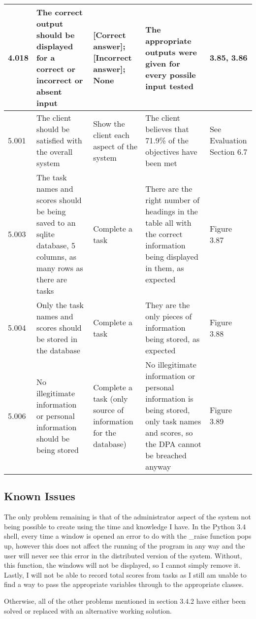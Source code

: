 \begin{landscape}
\begin{center}
\begin{longtable}{|p{2.5cm}|p{4cm}|p{4cm}|p{4.5cm}|p{3cm}|}
4.018 & The correct output should be displayed for a correct or incorrect or absent input & [Correct answer]; [Incorrect answer]; None & The appropriate outputs were given for every possile input tested & 3.85, 3.86 \\ \hline
5.001 & The client should be satisfied with the overall system & Show the client each aspect of the system & The client believes that 71.9\% of the objectives have been met & See Evaluation Section 6.7 \\ \hline
5.003 & The task names and scores should be being saved to an sqlite database, 5 columns, as many rows as there are tasks & Complete a task & There are the right number of headings in the table all with the correct information being displayed in them, as expected & Figure 3.87 \\ \hline
5.004 & Only the task names and scores should be stored in the database & Complete a task & They are the only pieces of information being stored, as expected & Figure 3.88 \\ \hline
5.006 & No illegitimate information or personal information should be being stored & Complete a task (only source of information for the database) & No illegitimate information or personal information is being stored, only task names and scores, so the DPA cannot be breached anyway & Figure 3.89 \\ \hline
\end{longtable}
\end{center}

\end{landscape}

\subsection{Known Issues}

The only problem remaining is that of the administrator aspect of the system not being possible to create using the time and knowledge I have. In the Python 3.4 shell, every time a window is opened an error to do with the \_raise function pops up, however this does not affect the running of the program in any way and the user will never see this error in the distributed version of the system. Without, this function, the windows will not be displayed, so I cannot simply remove it. Lastly, I will not be able to record total scores from tasks as I still am unable to find a way to pass the appropriate variables through to the appropriate classes.

Otherwise, all of the other problems mentioned in section 3.4.2 have either been solved or replaced with an alternative working solution.

